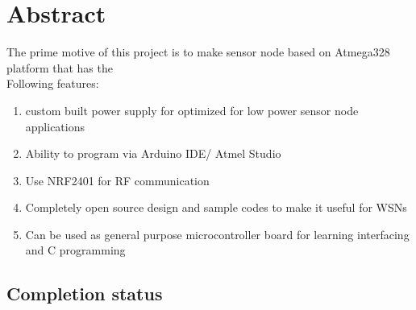 \documentclass[a4paper,12pt,oneside]{book}
\begin{document}
\section*{Abstract}
The prime motive of this project is to make sensor node based on Atmega328 platform that has the
\\ Following features:
\begin{enumerate}
\item custom built power supply for optimized for low power sensor node applications
\item Ability to program via Arduino IDE/ Atmel Studio 
\item Use NRF2401 for RF communication
\item Completely open source design and sample codes to make it useful for WSNs
\item Can be used as general purpose microcontroller board for learning interfacing and C programming
\end{enumerate}

\subsection*{Completion status}
 
\end{document}
